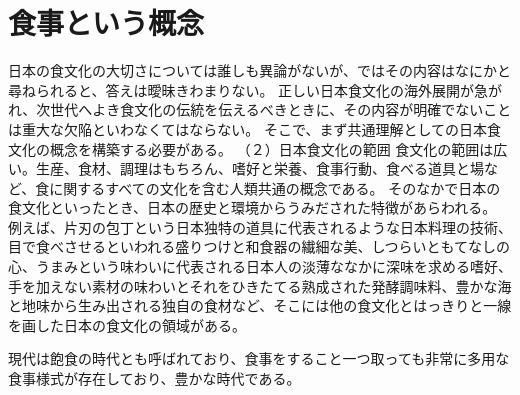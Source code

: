 \chapter{食事という概念}
日本の食文化の大切さについては誰しも異論がないが、ではその内容はなにかと尋ねられると、答えは曖昧きわまりない。
正しい日本食文化の海外展開が急がれ、次世代へよき食文化の伝統を伝えるべきときに、その内容が明確でないことは重大な欠陥といわなくてはならない。
そこで、まず共通理解としての日本食文化の概念を構築する必要がある。
（２）日本食文化の範囲
食文化の範囲は広い。生産、食材、調理はもちろん、嗜好と栄養、食事行動、食べる道具と場など、食に関するすべての文化を含む人類共通の概念である。
そのなかで日本の食文化といったとき、日本の歴史と環境からうみだされた特徴があらわれる。
例えば、片刃の包丁という日本独特の道具に代表されるような日本料理の技術、目で食べさせるといわれる盛りつけと和食器の繊細な美、しつらいともてなしの心、うまみという味わいに代表される日本人の淡薄ななかに深味を求める嗜好、手を加えない素材の味わいとそれをひきたてる熟成された発酵調味料、豊かな海と地味から生み出される独自の食材など、そこには他の食文化とはっきりと一線を画した日本の食文化の領域がある。

現代は飽食の時代とも呼ばれており、食事をすること一つ取っても非常に多用な食事様式が存在しており、豊かな時代である。


